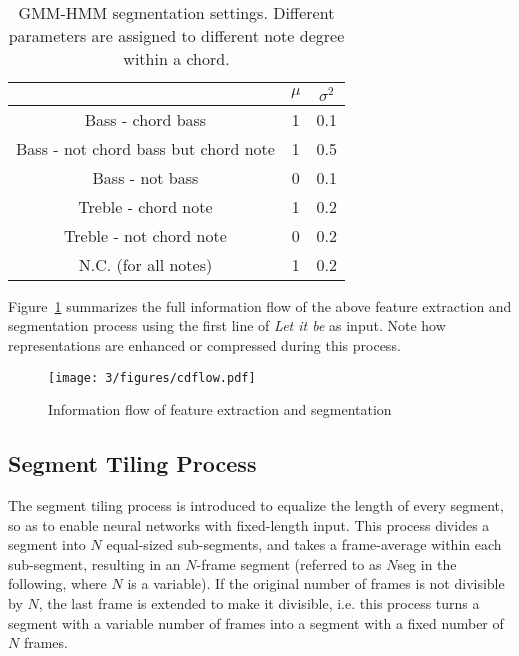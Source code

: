\begin{table}
\centering
\footnotesize
\begin{tabular}{|c|c|c|} \hline
      & $\mu$ & $\sigma^2$ \\ \hline
 Bass - chord bass & 1 & 0.1 \\ \hline
 Bass - not chord bass but chord note & 1 & 0.5  \\ \hline
 Bass - not bass & 0 & 0.1 \\ \hline
 Treble - chord note & 1 & 0.2  \\ \hline
 Treble - not chord note & 0 & 0.2 \\ \hline
 N.C. (for all notes)  & 1 & 0.2  \\ \hline
\end{tabular}
\caption{GMM-HMM segmentation settings. Different parameters are assigned to different note degree within a chord.}
\label{tab:3-gaussian}
\end{table}


Figure~\ref{fig:3-cdflow} summarizes the full information flow of the above feature extraction and segmentation process using the first line of {\it Let it be} as input. Note how representations are enhanced or compressed during this process.
\begin{figure}[h]
\centering
\texttt{[image: 3/figures/cdflow.pdf]}
\caption{Information flow of feature extraction and segmentation}
\label{fig:3-cdflow}
\end{figure}

\subsection{Segment Tiling Process} \label{sec:3-seg-tile}

The segment tiling process is introduced to equalize the length of every segment, so as to enable neural networks with fixed-length input. This process divides a segment into $N$ equal-sized sub-segments, and takes a frame-average within each sub-segment, resulting in an $N$-frame segment (referred to as $N$seg in the following, where $N$ is a variable). If the original number of frames is not divisible by $N$, the last frame is extended to make it divisible, i.e. this process turns a segment with a variable number of frames into a segment with a fixed number of $N$ frames.

